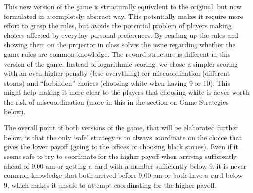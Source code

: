 \documentclass[twocolumn,a4paper,superscriptaddress,nofootinbib]{revtex4}
\newcommand{\tsn}[1]{{\color{blue} TSN: #1}}
\newcommand{\add}[1]{{\color{green2} Add: #1}}
\begin{document}
This new version of the game is structurally equivalent to the original, but now formulated in a completely abstract way. This potentially makes it require more effort to grasp the rules, but avoids the potential problem of players making choices affected by everyday personal preferences. By reading up the rules and showing them on the projector in class solves the issue regarding whether the game rules are common knowledge. The reward structure is different in this version of the game. Instead of logarithmic scoring, we chose a simpler scoring with an even higher penalty (lose everything) for miscoordination (different stones) and ``forbidden'' choices (choosing white when having 9 or 10). This might help making it more clear to the players that choosing white is never worth the risk of miscoordination (more in this in the section on Game Strategies below).

The overall point of both versions of the game, that will be elaborated further below, is that the only `safe' strategy is to always coordinate on the choice that gives the lower payoff (going to the offices or choosing black stones). Even if it seems safe to try to coordinate for the higher payoff when arriving sufficiently ahead of 9:00 am or getting a card with a number sufficiently below 9, it is never common knowledge that both arrived before 9:00 am or both have a card below 9, which makes it unsafe to attempt coordinating for the higher payoff. 


\end{document}
